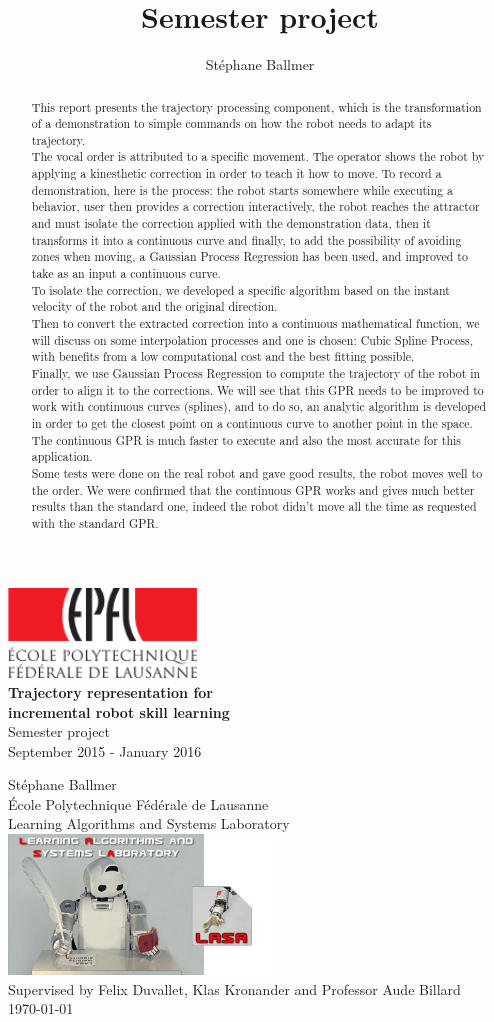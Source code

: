 \documentclass[12pt,a4paper]{article}
\title{Semester project}
\author{St\'{e}phane Ballmer}
\newcommand\blankpage{
    \null
    \thispagestyle{empty}
    \newpage}
\renewcommand{\maketitle}{
\begin{titlepage}
\centering
\includegraphics[width=5cm]{img/EPFL_LOGO.png}\\
\vspace*{3cm}
\LARGE{\textbf{Trajectory representation for\\incremental robot skill learning\\}}
Semester project\\
\normalsize{September 2015 - January 2016}



\vspace*{2cm}
\Large{St\'{e}phane Ballmer} \\
\vspace*{2cm}
\normalsize{\'{E}cole Polytechnique F\'{e}d\'{e}rale de Lausanne\\Learning Algorithms and Systems Laboratory\\}
\vspace*{1cm}
\includegraphics[width=7cm]{img/lasa-logo.jpg}\\
\vspace*{2cm}
\large{Supervised by Felix Duvallet, Klas Kronander and Professor Aude Billard\\}
\vspace*{1cm}
\today
\end{titlepage}
}
\begin{document}
\maketitle
\thispagestyle{plain}

\blankpage
\addtocounter{page}{-1}
\thispagestyle{empty}

\begin{abstract}
\thispagestyle{empty}

This report presents the trajectory processing component, which is the transformation of a demonstration to simple commands on how the robot needs to adapt its trajectory.\\

The vocal order is attributed to a specific movement. The operator shows the robot by applying a kinesthetic correction in order to teach it how to move. To record a demonstration, here is the process: the robot starts somewhere while executing a behavior, user then provides a correction interactively, the robot reaches the attractor and must isolate the correction applied with the demonstration data, then it transforms it into a continuous curve and finally, to add the possibility of avoiding zones when moving, a Gaussian Process Regression has been used, and improved to take as an input a continuous curve.\\

To isolate the correction, we developed a specific algorithm based on the instant velocity of the robot and the original direction.\\ 
\hspace*{0.6cm}Then to convert the extracted correction into a continuous mathematical function, we will discuss on some interpolation processes and one is chosen: Cubic Spline Process, with benefits from a low computational cost and the best fitting possible.\\
\hspace*{0.6cm}Finally, we use Gaussian Process Regression to compute the trajectory of the robot in order to align it to the corrections. We will see that this GPR needs to be improved to work with continuous curves (splines), and to do so, an analytic algorithm is developed in order to get the closest point on a continuous curve to another point in the space. The continuous GPR is much faster to execute and also the most accurate for this application.\\

Some tests were done on the real robot and gave good results, the robot moves well to the order. We were confirmed that the continuous GPR works and gives much better results than the standard one, indeed the robot didn't move all the time as requested with the standard GPR.\\


\end{abstract}
\end{document}
